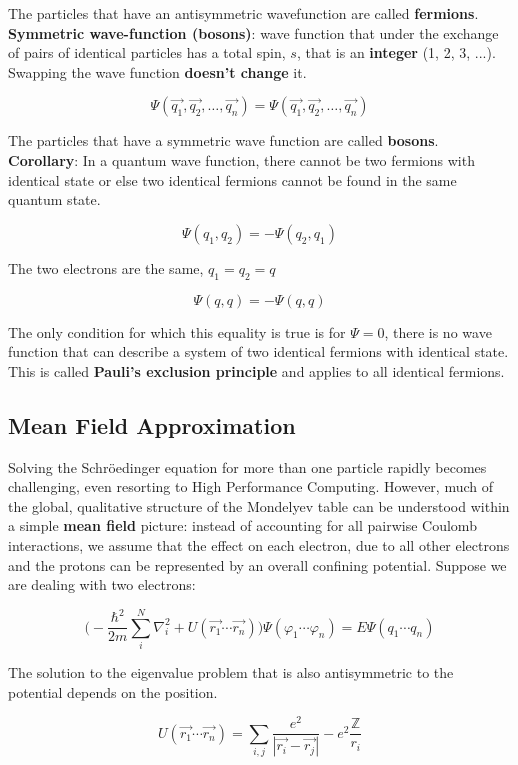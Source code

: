 	The particles that have an antisymmetric wavefunction are called \textbf{fermions}.
	\newline
	\textbf{Symmetric wave-function (bosons)}: wave function that under the exchange of pairs of identical particles has a total spin, $s$, that is an \textbf{integer} (1, 2, 3, ...).
Swapping the wave function \textbf{doesn't change} it.

	$$\Psi(\vec{q_1},\vec{q_2}, \dots, \vec{q_n})=\Psi(\vec{q_1},\vec{q_2}, \dots, \vec{q_n})$$

	The particles that have a symmetric wave function are called \textbf{bosons}.
	\textbf{Corollary}: In a quantum wave function, there cannot be two fermions with identical state or else two identical fermions cannot be found in the same quantum state.

	$$\Psi(q_1, q_2)= -\Psi(q_2,q_1)$$

	The two electrons are the same, $q_1=q_2=q$

	$$\Psi(q,q)=-\Psi(q,q)$$

	The only condition for which this equality is true is for  $\Psi = 0$, there is no wave function that can describe a system of two identical fermions with identical state.
This is called \textbf{Pauli's exclusion principle} and applies to all identical fermions.
	\\
	\subsection{Mean Field Approximation}
	Solving the Schr\"oedinger equation for more than one particle rapidly becomes challenging, even resorting to High Performance Computing.
However, much of the global, qualitative structure of the Mondelyev table can be understood within a simple \textbf{mean field} picture: instead of accounting for all pairwise Coulomb interactions, we assume that the effect on each electron, due to all other electrons and the protons can be represented by an overall confining potential.
	Suppose we are dealing with two electrons:

	$$\bigg(-\frac{\hbar^2}{2m}\sum_{i}^{N}\nabla^2_i+U(\vec{r_1}\cdots\vec{r_n})\bigg)\Psi(\varphi_1 \cdots\varphi_n)=E\Psi(q_1 \cdots q_n)$$

	The solution to the eigenvalue problem that is also antisymmetric to the potential depends on the position.

	$$U(\vec{r_1}\cdots\vec{r_n})=\sum_{i,j}\frac{e^2}{|\vec{r_i}-\vec{r_j}|}-e^2\frac{\mathbb{Z}}{r_i}$$

